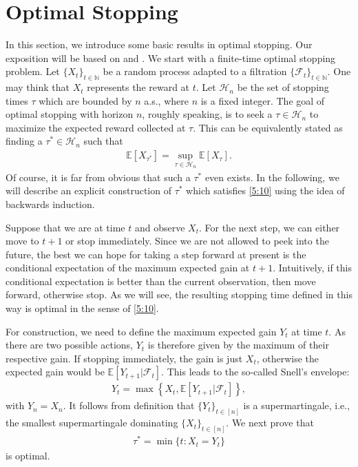 \documentclass[letterpaper,11pt,openright,openany]{book}
\numberwithin{equation}{section}
\theoremstyle{plain}
\theoremstyle{definition}
\def\N{{\mathbb N}}
\def\E{{\mathbb E}}
\def\F{{\mathcal F}}
\def\H{{\mathcal H}}
\begin{document}
\section{Optimal Stopping}\label{234}

In this section, we introduce some basic results in optimal stopping. Our exposition will be based on \cite{szepesvari2010algorithms} and \cite{ferguson2002optimal}.  
We start with a finite-time optimal stopping problem. 
Let $\{X_t\}_{t\in\N}$ be a random process adapted to a filtration $\{\F_t\}_{t\in\N}$. 
One may think that $X_t$ represents the reward at $t$. 
Let $\H_n$ be the set of stopping times $\tau$ which are bounded by $n$ a.s., where $n$ is a fixed integer. 
The goal of optimal stopping with horizon $n$, roughly speaking, is to seek a $\tau\in\H_n$ to maximize the expected reward collected at $\tau$. This can be equivalently stated as finding a $\tau^*\in\H_n$ such that 
\begin{align}
\E[X_{\tau^*}] = \sup_{\tau\in\H_n}\E[X_\tau].\label{5:10}
\end{align}
Of course, it is far from obvious that such a $\tau^*$ even exists. In the following, we will describe an explicit construction of $\tau^*$ which satisfies \eqref{5:10} using the idea of backwards induction.  


Suppose that we are at time $t$ and observe $X_t$. For the next step, we can either move to $t+1$ or stop immediately. 
Since we are not allowed to peek into the future, the best we can hope for taking a step forward at present is the conditional expectation of the maximum expected gain at $t+1$.  
Intuitively, if this conditional expectation is better than the current observation, then move forward, otherwise stop. 
As we will see, the resulting stopping time defined in this way is optimal in the sense of \eqref{5:10}. 

For construction, we need to define the maximum expected gain $Y_t$ at time $t$.
As there are two possible actions, $Y_t$ is therefore given by the maximum of their respective gain. 
If stopping immediately, the gain is just $X_t$, otherwise the expected gain would be $\E[Y_{t+1}|\F_t]$. 
This leads to the so-called Snell's envelope:
\begin{align*}
Y_t = \max\left\{X_t, \E[Y_{t+1}|\F_t]\right\}, 
\end{align*}
with $Y_n = X_n$. 
It follows from definition that $\{Y_t\}_{t\in [n]}$ is a supermartingale, i.e., the smallest supermartingale dominating $\{X_t\}_{t\in [n]}$. We next prove that 
\begin{align}
\tau^*=\min\{t: X_t = Y_t\}\label{pr3}
\end{align}
is optimal.
\end{document}
